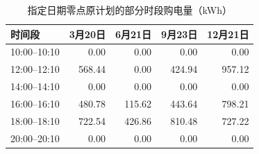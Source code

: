 \begin{table}[H]
\centering
\caption{指定日期零点原计划的部分时段购电量（kWh）}
\label{tab:q3_original_order}
\small
\setlength{\tabcolsep}{5pt}
\begin{tabular}{lrrrr}
\toprule
时间段 & 3月20日 & 6月21日 & 9月23日 & 12月21日 \\
\midrule
10:00--10:10 & 0.00 & 0.00 & 0.00 & 0.00 \\
12:00--12:10 & 568.44 & 0.00 & 424.94 & 957.12 \\
14:00--14:10 & 0.00 & 0.00 & 0.00 & 0.00 \\
16:00--16:10 & 480.78 & 115.62 & 443.64 & 798.21 \\
18:00--18:10 & 722.54 & 426.86 & 810.48 & 727.22 \\
20:00--20:10 & 0.00 & 0.00 & 0.00 & 0.00 \\
\bottomrule
\end{tabular}
\end{table}
